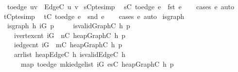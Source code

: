 \begin{isabellebody}
\isanewline
\ \ {\isachardoublequoteopen}to{\isacharunderscore}edge\ {\isacharparenleft}u{\isacharcomma}v{\isacharparenright}\ {\isacharequal}\ Edge{\isacharunderscore}C\ u\ v{\isachardoublequoteclose}\isanewline
\isanewline
{}\isamarkupfalse%
\ s{\isacharunderscore}C{\isacharunderscore}pte{\isacharbrackleft}simp{\isacharbrackright}{\isacharcolon}\isanewline
\ \ {\isachardoublequoteopen}s{\isacharunderscore}C\ {\isacharparenleft}to{\isacharunderscore}edge\ e{\isacharparenright}\ {\isacharequal}\ fst\ e{\isachardoublequoteclose}\isanewline
%
\isadelimproof
\ \ %
\endisadelimproof
%
\isatagproof
{}\isamarkupfalse%
\ {\isacharparenleft}cases\ e{\isacharparenright}\ auto%
\endisatagproof
{\isafoldproof}%
%
\isadelimproof
\isanewline
%
\endisadelimproof
\isanewline
{}\isamarkupfalse%
\ t{\isacharunderscore}C{\isacharunderscore}pte{\isacharbrackleft}simp{\isacharbrackright}{\isacharcolon}\isanewline
\ \ {\isachardoublequoteopen}t{\isacharunderscore}C\ {\isacharparenleft}to{\isacharunderscore}edge\ e{\isacharparenright}\ {\isacharequal}\ snd\ e{\isachardoublequoteclose}\isanewline
%
\isadelimproof
\ \ %
\endisadelimproof
%
\isatagproof
{}\isamarkupfalse%
\ {\isacharparenleft}cases\ e{\isacharparenright}\ auto%
\endisatagproof
{\isafoldproof}%
%
\isadelimproof
\isanewline
%
\endisadelimproof
\isanewline
{}\isamarkupfalse%
\ is{\isacharunderscore}graph\ \isanewline
\ \ {\isachardoublequoteopen}is{\isacharunderscore}graph\ h\ iG\ p\ {\isasymequiv}\isanewline
\ \ \ \ is{\isacharunderscore}valid{\isacharunderscore}Graph{\isacharunderscore}C\ h\ p\ {\isasymand}\ \isanewline
\ \ \ \ ivertex{\isacharunderscore}cnt\ iG\ {\isacharequal}\ n{\isacharunderscore}C\ {\isacharparenleft}heap{\isacharunderscore}Graph{\isacharunderscore}C\ h\ p{\isacharparenright}\ {\isasymand}\ \isanewline
\ \ \ \ iedge{\isacharunderscore}cnt\ iG\ {\isacharequal}\ m{\isacharunderscore}C\ {\isacharparenleft}heap{\isacharunderscore}Graph{\isacharunderscore}C\ h\ p{\isacharparenright}\ {\isasymand}\isanewline
\ \ \ \ arrlist\ {\isacharparenleft}heap{\isacharunderscore}Edge{\isacharunderscore}C\ h{\isacharparenright}\ {\isacharparenleft}is{\isacharunderscore}valid{\isacharunderscore}Edge{\isacharunderscore}C\ h{\isacharparenright}\isanewline
\ \ \ \ \ \ {\isacharparenleft}map\ to{\isacharunderscore}edge\ {\isacharparenleft}mk{\isacharunderscore}iedge{\isacharunderscore}list\ iG{\isacharparenright}{\isacharparenright}\ {\isacharparenleft}es{\isacharunderscore}C\ {\isacharparenleft}heap{\isacharunderscore}Graph{\isacharunderscore}C\ h\ p{\isacharparenright}{\isacharparenright}{\isachardoublequoteclose}\isanewline

\end{isabellebody}
